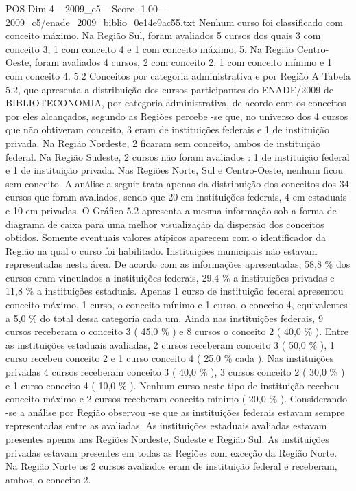 \begin{textsample}{POS Dim 4 – 2009\_c5 – Score -1.00 – 2009\_c5/enade\_2009\_biblio\_0e14e9ac55.txt}
Nenhum curso foi classificado com conceito máximo.
Na Região Sul, foram avaliados 5 cursos dos quais 3 com conceito 3, 1 com conceito 4 e 1 com conceito máximo, 5.
Na Região Centro-Oeste, foram avaliados 4 cursos, 2 com conceito 2, 1 com conceito mínimo e 1 com conceito 4. 5.2 Conceitos por categoria administrativa e por Região A Tabela 5.2, que apresenta a distribuição dos cursos participantes do ENADE/2009 de BIBLIOTECONOMIA, por categoria administrativa, de acordo com os conceitos por eles alcançados, segundo as Regiões percebe -se que, no universo dos 4 cursos que não obtiveram conceito, 3 eram de instituições federais e 1 de instituição privada.
Na Região Nordeste, 2 ficaram sem conceito, ambos de instituição federal.
Na Região Sudeste, 2 cursos não foram avaliados : 1 de instituição federal e 1 de instituição privada.
Nas Regiões Norte, Sul e Centro-Oeste, nenhum ficou sem conceito.
A análise a seguir trata apenas da distribuição dos conceitos dos 34 cursos que foram avaliados, sendo que 20 em instituições federais, 4 em estaduais e 10 em privadas.
O Gráfico 5.2 apresenta a mesma informação sob a forma de diagrama de caixa para uma melhor visualização da dispersão dos conceitos obtidos.
Somente eventuais valores atípicos aparecem com o identificador da Região na qual o curso foi habilitado.
Instituições municipais não estavam representadas nesta área.
De acordo com as informações apresentadas, 58,8 \% dos cursos eram vinculados a instituições federais, 29,4 \% a instituições privadas e 11,8 \% a instituições estaduais.
Apenas 1 curso de instituição federal apresentou conceito máximo, 1 curso, o conceito mínimo e 1 curso, o conceito 4, equivalentes a 5,0 \% do total dessa categoria cada um.
Ainda nas instituições federais, 9 cursos receberam o conceito 3 ( 45,0 \% ) e 8 cursos o conceito 2 ( 40,0 \% ).
Entre as instituições estaduais avaliadas, 2 cursos receberam conceito 3 ( 50,0 \% ), 1 curso recebeu conceito 2 e 1 curso conceito 4 ( 25,0 \% cada ).
Nas instituições privadas 4 cursos receberam conceito 3 ( 40,0 \% ), 3 cursos conceito 2 ( 30,0 \% ) e 1 curso conceito 4 ( 10,0 \% ).
Nenhum curso neste tipo de instituição recebeu conceito máximo e 2 cursos receberam conceito mínimo ( 20,0 \% ).
Considerando -se a análise por Região observou -se que as instituições federais estavam sempre representadas entre as avaliadas.
As instituições estaduais avaliadas estavam presentes apenas nas Regiões Nordeste, Sudeste e Região Sul.
As instituições privadas estavam presentes em todas as Regiões com exceção da Região Norte.
Na Região Norte os 2 cursos avaliados eram de instituição federal e receberam, ambos, o conceito 2.

\end{textsample}
